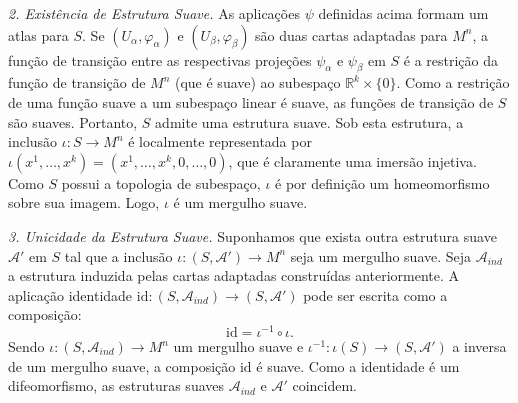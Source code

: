 {	\textit{2. Existência de Estrutura Suave.}
	As aplicações $\psi$ definidas acima formam um atlas para $S$. Se $(U_\alpha, \varphi_\alpha)$ e $(U_\beta, \varphi_\beta)$ são duas cartas adaptadas para $M^n$, a função de transição entre as respectivas projeções $\psi_\alpha$ e $\psi_\beta$ em $S$ é a restrição da função de transição de $M^n$ (que é suave) ao subespaço $\mathbb{R}^k \times \{0\}$. Como a restrição de uma função suave a um subespaço linear é suave, as funções de transição de $S$ são suaves. Portanto, $S$ admite uma estrutura suave.
	Sob esta estrutura, a inclusão $\iota : S \to M^n$ é localmente representada por $\iota(x^1, \dots, x^k) = (x^1, \dots, x^k, 0, \dots, 0)$, que é claramente uma imersão injetiva. Como $S$ possui a topologia de subespaço, $\iota$ é por definição um homeomorfismo sobre sua imagem. Logo, $\iota$ é um mergulho suave.
	
	\textit{3. Unicidade da Estrutura Suave.}
	Suponhamos que exista outra estrutura suave $\mathcal{A}'$ em $S$ tal que a inclusão $\iota : (S, \mathcal{A}') \to M^n$ seja um mergulho suave. Seja $\mathcal{A}_{ind}$ a estrutura induzida pelas cartas adaptadas construídas anteriormente.
	A aplicação identidade $\text{id} : (S, \mathcal{A}_{ind}) \to (S, \mathcal{A}')$ pode ser escrita como a composição:
	\begin{equation*}
		\text{id} = \iota^{-1} \circ \iota.
	\end{equation*}
	Sendo $\iota : (S, \mathcal{A}_{ind}) \to M^n$ um mergulho suave e $\iota^{-1} : \iota(S) \to (S, \mathcal{A}')$ a inversa de um mergulho suave, a composição $\text{id}$ é suave. Como a identidade é um difeomorfismo, as estruturas suaves $\mathcal{A}_{ind}$ e $\mathcal{A}'$ coincidem.
}


